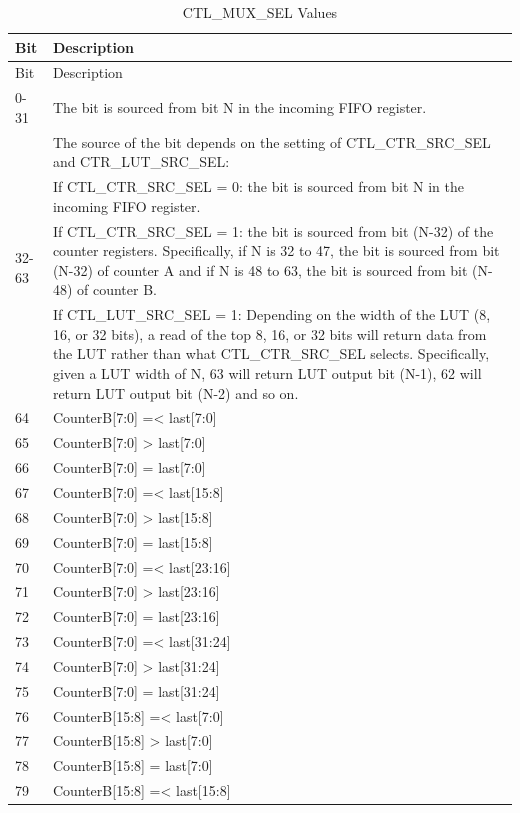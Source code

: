 \documentclass[main\_\_EN.tex]{subfiles}
\begin{document}
\begin{longtable}{ | p{3cm} | p{13cm} | }
\caption{CTL\_MUX\_SEL Values} \label{tab:bitscrm-ctrmuxsrc} \\
\hline\rowcolor{lightgray}
Bit & Description \\ \hline
\endfirsthead
\hline\rowcolor{lightgray}
Bit & Description \\
\hline
\endhead
0-31 & The bit is sourced from bit N in the incoming FIFO register. \\
\hline
\multirow{4}{4em}{32-63} & The source of the bit depends on the setting of CTL\_CTR\_SRC\_SEL and
CTR\_LUT\_SRC\_SEL: \\
& If CTL\_CTR\_SRC\_SEL = 0: the bit is sourced from bit N in the incoming FIFO register.\\
& If CTL\_CTR\_SRC\_SEL = 1: the bit is sourced from bit (N-32) of the counter registers. Specifically, if N is 32 to 47, the bit is sourced from bit (N-32) of counter A and if N is 48 to 63, the bit is sourced from bit (N-48) of counter B. \\
& If CTL\_LUT\_SRC\_SEL = 1: Depending on the width of the LUT (8, 16, or 32 bits), a read of the top 8, 16, or 32 bits will return data from the LUT rather than what CTL\_CTR\_SRC\_SEL selects. Specifically, given a LUT width of N, 63 will return LUT output bit (N-1), 62 will return LUT output bit (N-2) and so on.\\
\hline
64 & CounterB[7:0] =< last[7:0] \\
65 & CounterB[7:0] > last[7:0] \\
66 & CounterB[7:0] = last[7:0] \\
67 & CounterB[7:0] =< last[15:8] \\
68 & CounterB[7:0] > last[15:8] \\
69 & CounterB[7:0] = last[15:8] \\
70 & CounterB[7:0] =< last[23:16] \\
71 & CounterB[7:0] > last[23:16] \\
72 & CounterB[7:0] = last[23:16] \\
73 & CounterB[7:0] =< last[31:24] \\
74 & CounterB[7:0] > last[31:24] \\
75 & CounterB[7:0] = last[31:24] \\
76 & CounterB[15:8] =< last[7:0] \\
77 & CounterB[15:8] > last[7:0] \\
78 & CounterB[15:8] = last[7:0] \\
79 & CounterB[15:8] =< last[15:8] \\

\end{longtable}
\end{document}
